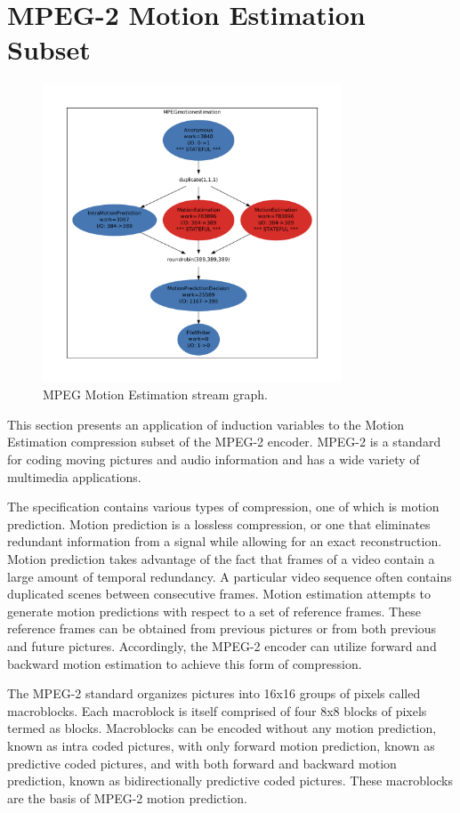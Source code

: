 \section{MPEG-2 Motion Estimation Subset}


\begin{figure}[t]
\includegraphics[width=3.5in]{work_estimate_mpeg_motionestimation.pdf}
\caption{MPEG Motion Estimation stream graph.\protect\label{fig:mpegMEgraph}}
\end{figure}


This section presents an application of induction variables to the Motion Estimation compression subset of the MPEG-2 encoder.  MPEG-2 is a standard for coding moving pictures and audio information and has a wide variety of multimedia applications.  

The specification contains various types of compression, one of which is motion prediction.  Motion prediction is a lossless compression, or one that eliminates redundant information from a signal while allowing for an exact reconstruction.  Motion prediction takes advantage of the fact that frames of a video contain a large amount of temporal redundancy.  A particular video sequence often contains duplicated scenes between consecutive frames.  Motion estimation attempts to generate motion predictions with respect to a set of reference frames.  These reference frames can be obtained from previous pictures or from both previous and future pictures.  Accordingly, the MPEG-2 encoder can utilize forward and backward motion estimation to achieve this form of compression.

The MPEG-2 standard organizes pictures into 16x16 groups of pixels called macroblocks.  Each macroblock is itself comprised of four 8x8 blocks of pixels termed as blocks.  Macroblocks can be encoded without any motion prediction, known as intra coded pictures, with only forward motion prediction, known as predictive coded pictures, and with both forward and backward motion prediction, known as bidirectionally predictive coded pictures.  These macroblocks are the basis of MPEG-2 motion prediction.  

